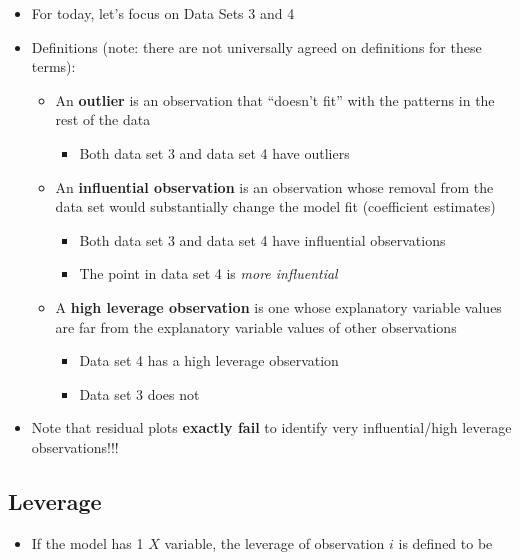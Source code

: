 \documentclass[]{extarticle}
\providecommand{\tightlist}{%
  \setlength{\itemsep}{0pt}\setlength{\parskip}{0pt}}
\begin{document}
\begin{itemize}
\tightlist
\item
  For today, let's focus on Data Sets 3 and 4
\item
  Definitions (note: there are not universally agreed on definitions for
  these terms):

  \begin{itemize}
  \tightlist
  \item
    An \textbf{outlier} is an observation that ``doesn't fit'' with the
    patterns in the rest of the data

    \begin{itemize}
    \tightlist
    \item
      Both data set 3 and data set 4 have outliers
    \end{itemize}
  \item
    An \textbf{influential observation} is an observation whose removal
    from the data set would substantially change the model fit
    (coefficient estimates)

    \begin{itemize}
    \tightlist
    \item
      Both data set 3 and data set 4 have influential observations
    \item
      The point in data set 4 is \emph{more influential}
    \end{itemize}
  \item
    A \textbf{high leverage observation} is one whose explanatory
    variable values are far from the explanatory variable values of
    other observations

    \begin{itemize}
    \tightlist
    \item
      Data set 4 has a high leverage observation
    \item
      Data set 3 does not
    \end{itemize}
  \end{itemize}
\item
  Note that residual plots \textbf{exactly fail} to identify very
  influential/high leverage observations!!!
\end{itemize}

\newpage

\subsection{Leverage}\label{leverage}

\begin{itemize}
\tightlist
\item
  If the model has 1 \(X\) variable, the leverage of observation \(i\)
  is defined to be
\end{itemize}
\end{document}
